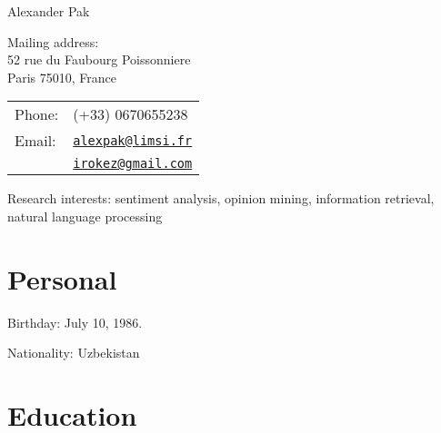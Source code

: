 \documentclass[letterpaper]{article}
\def\name{Alexander Pak}
\renewenvironment{itemize}{
  \begin{list}{}{
    \setlength{\leftmargin}{0.6em}
  }
}{
  \end{list}
}
\begin{document}
{\huge \name}


\vspace{0.25in}

\begin{minipage}{0.45\linewidth}
	Mailing address:\\
	52 rue du Faubourg Poissonniere \\
	Paris 75010, France
\end{minipage}
\begin{minipage}{0.45\linewidth}
  \begin{tabular}{ll}
    Phone: & (+33) 0670655238 \\
    Email: & \href{mailto:alexpak@limsi.fr}{\tt alexpak@limsi.fr}\\
	       & \href{mailto:irokez@gmail.com}{\tt irokez@gmail.com}
  \end{tabular}
\end{minipage}

\vspace{2em}
Research interests: sentiment analysis, opinion mining, information retrieval, natural language processing

\section*{Personal}

\begin{itemize}
\item Birthday: July 10, 1986.
\item Nationality: Uzbekistan
\end{itemize}


\section*{Education}
\end{document}
